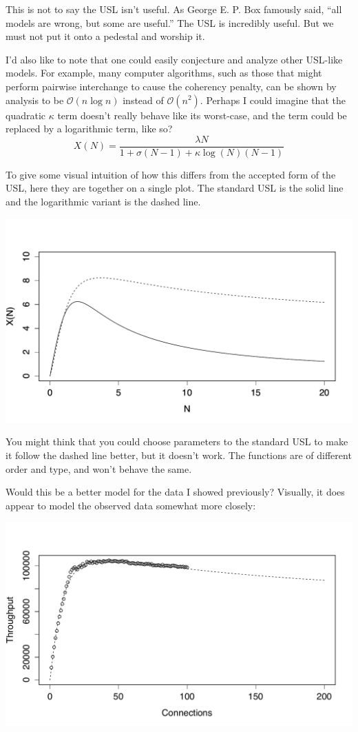 \documentclass{vivid_layout}
\begin{document}
This is not to say the USL isn't useful. As George E. P. Box famously said,
``all models are wrong, but some are useful.'' The USL is incredibly useful. But
we must not put it onto a pedestal and worship it.  

I'd also like to note that one could easily conjecture and analyze other
USL-like models. For example, many computer algorithms, such as those
that might perform pairwise interchange to cause the coherency penalty, can be shown
by analysis to be $\mathcal{O}(n\log{}n)$ instead of $\mathcal{O}(n^2)$. Perhaps
I could imagine that the quadratic $\kappa$ term doesn't really behave like its
worst-case, and the term could be replaced by a logarithmic term, like so?
\begin{equation}
X(N) = \frac{\lambda N}{1 + \sigma(N-1) + \kappa \log(N)(N-1)}
\label{usl_log}
\end{equation}

To give some visual intuition of how this differs from the accepted form of the
USL, here they are together on a single plot. The standard USL is the solid line
and the logarithmic variant is the dashed line.
\begin{center}
\includegraphics[width=.85\linewidth]{scalability/logscale}
\end{center}

You might think that you could choose parameters to the standard USL to make it
follow the dashed line better, but it doesn't work. The functions are of
different order and type, and won't behave the same.

Would this be a better model for the data I showed previously? Visually, it does
appear to model the observed data somewhat more closely:
\begin{center}
\includegraphics[width=.85\linewidth]{scalability/logscale-2}
\end{center}
\end{document}
